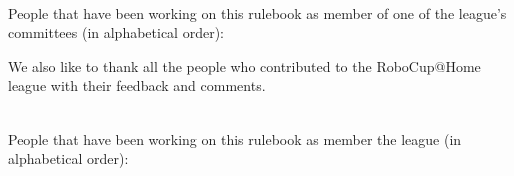 ~\\\noindent People that have been working on this rulebook as member of one of the league's committees (in alphabetical order):
\begin{center}
\begin{minipage}{0.8\textwidth}
\begin{multicols}{3}%
\footnotesize
\noindent%

\end{multicols}
\end{minipage}
\end{center}

We also like to thank all the people who contributed to the RoboCup@Home league with their feedback and comments.

~\\\noindent People that have been working on this rulebook as member the league (in alphabetical order):
\begin{center}
\begin{minipage}{0.8\textwidth}
\begin{multicols}{2}%
\footnotesize
\noindent%
\end{multicols}
\end{minipage}
\end{center}


